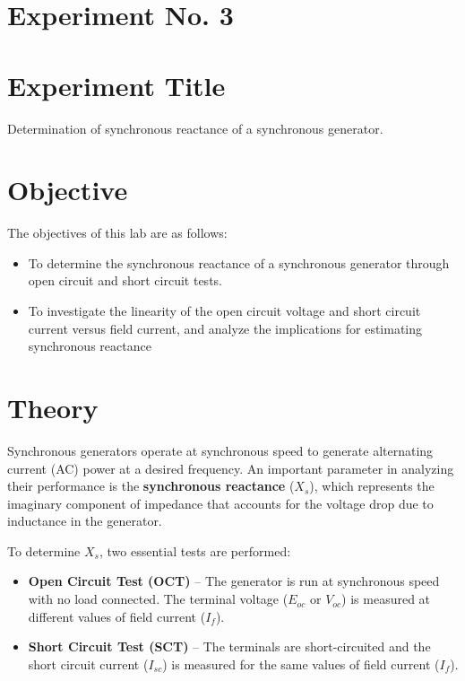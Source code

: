 \documentclass[a4paper,12pt]{article}
\begin{document}
	\section{Experiment No. 3}
	
	\section{Experiment Title }
	Determination of synchronous reactance of a synchronous generator.
	
	\section{Objective}
	
	The objectives of this lab are as follows:
	\begin{itemize}
\item To determine the synchronous reactance of a synchronous generator through open circuit and short circuit tests.
\item To investigate the linearity of the open circuit voltage and short circuit current versus field current, and analyze the implications for estimating synchronous reactance
		
		
	\end{itemize}
	
	\section{Theory}
	
	Synchronous generators operate at synchronous speed to generate alternating current (AC) power at a desired frequency. An important parameter in analyzing their performance is the \textbf{synchronous reactance} ($X_s$), which represents the imaginary component of impedance that accounts for the voltage drop due to inductance in the generator.
	
	To determine $X_s$, two essential tests are performed:
	\begin{itemize}
		\item \textbf{Open Circuit Test (OCT)} – The generator is run at synchronous speed with no load connected. The terminal voltage ($E_{oc}$ or $V_{oc}$) is measured at different values of field current ($I_f$).
		\item \textbf{Short Circuit Test (SCT)} – The terminals are short-circuited and the short circuit current ($I_{sc}$) is measured for the same values of field current ($I_f$).
	\end{itemize}
	
\end{document}

